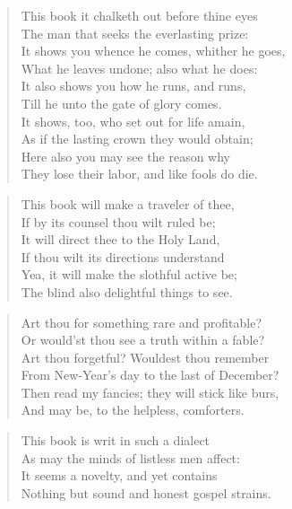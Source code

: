 \begin{verse}
This book it chalketh out before thine eyes\\
The man that seeks the everlasting prize:\\
It shows you whence he comes, whither he goes,\\
What he leaves undone; also what he does:\\
It also shows you how he runs, and runs,\\
Till he unto the gate of glory comes.\\
It shows, too, who set out for life amain,\\
As if the lasting crown they would obtain;\\
Here also you may see the reason why\\
They lose their labor, and like fools do die.\\
\end{verse}
\begin{verse}
This book will make a traveler of thee,\\
If by its counsel thou wilt ruled be;\\
It will direct thee to the Holy Land,\\
If thou wilt its directions understand\\
Yea, it will make the slothful active be;\\
The blind also delightful things to see.\\
\end{verse}
\begin{verse}
Art thou for something rare and profitable?\\
Or would'st thou see a truth within a fable?\\
Art thou forgetful? Wouldest thou remember\\
From New-Year's day to the last of December?\\
Then read my fancies; they will stick like burs,\\
And may be, to the helpless, comforters.\\
\end{verse}
\begin{verse}
This book is writ in such a dialect\\
As may the minds of listless men affect:\\
It seems a novelty, and yet contains\\
Nothing but sound and honest gospel strains.\\
\end{verse}

